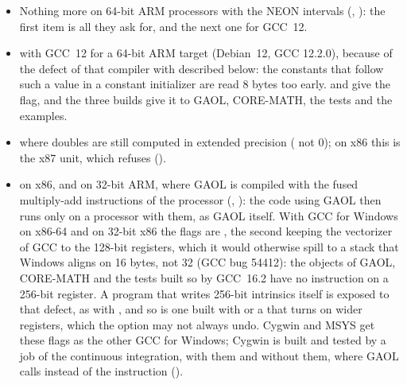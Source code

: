 \begin{itemize}
  Windows realign the stack of a function that needs it, and that test passes
  without them with GCC for MinGW-w64, with Clang and with clang-cl, in the
  continuous integration.
\item Nothing more on 64-bit ARM processors with the NEON intervals
  (, ): the first item is all they ask
  for, and the next one for GCC~12.\newinvfive
\item {} with GCC~12 for a 64-bit ARM target
  (Debian~12, GCC 12.2.0), because of the defect of that compiler with
   described below: the
  constants that follow such a value in a constant initializer are read 8
  bytes too early.  and  give the flag, and the
  three builds give it to GAOL, CORE-MATH, the tests and the
  examples.\newinvfive
\item {} where doubles are still computed in extended
  precision ( not 0); on x86 this is the x87 unit,
  which  refuses ().
\item {} on x86, and  on
  32-bit ARM, where GAOL is compiled with the fused multiply-add instructions
  of the processor (, ): the code
  using GAOL then runs only on a processor with them, as GAOL itself. With GCC
  for Windows on x86-64 and on 32-bit x86 the flags are , the second keeping the vectorizer of GCC to the
  128-bit registers, which it would otherwise spill to a stack that Windows
  aligns on 16 bytes, not 32 (GCC bug 54412): the objects of GAOL, CORE-MATH
  and the tests built so by GCC~16.2 have no instruction on a 256-bit
  register. A program that writes 256-bit intrinsics itself is exposed to that
  defect, as with , and so is one built with
   or a  that turns on wider registers, which
  the option may not always undo. Cygwin and MSYS get these flags as the other
  GCC for Windows; Cygwin is built and tested by a job of the continuous
  integration, with them and without them, where GAOL calls
   instead of the instruction
  ().\newinvfive
\end{itemize}

